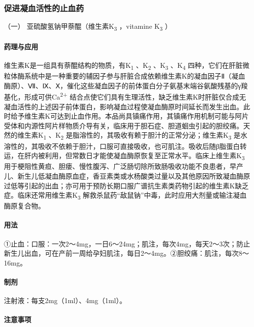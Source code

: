 \subsubsection{促进凝血活性的止血药}

\hypertarget{text00438.htmlux5cux23CHP17-8-1-1}{}
（一） 亚硫酸氢钠甲萘醌（维生素K\textsubscript{3} ，vitamine
K\textsubscript{3} ）

\paragraph{药理与应用}

维生素K是一组具有萘醌结构的物质，有K\textsubscript{1}
、K\textsubscript{2} 、K\textsubscript{3} 、K\textsubscript{4}
四种，它们在肝脏微粒体酶系统中是一种重要的辅因子参与肝脏合成依赖维生素K的凝血因子Ⅱ（凝血酶原）、Ⅶ、Ⅸ、Ⅹ，催化这些凝血因子的前体蛋白分子氨基末端谷氨酸残基的γ羧基化，形成可供Ca\textsuperscript{2+}
结合点使它们具有生理活性，缺乏维生素K时肝脏仅合成无凝血活性的上述因子前体蛋白，影响凝血过程使凝血酶原时间延长而发生出血。此时给予维生素K可达到止血作用。本品尚具镇痛作用，其镇痛作用机制可能与阿片受体和内源性阿片样物质介导有关，临床用于胆石症、胆道蛔虫引起的胆绞痛。天然的维生素K\textsubscript{1}
、K\textsubscript{2}
是脂溶性的，其吸收有赖于胆汁的正常分泌；维生素K\textsubscript{3}
是水溶性的，其吸收不依赖于胆汁，口服可直接吸收，也可肌注。吸收后随β脂蛋白转运，在肝内被利用，但常数日才能使凝血酶原恢复至正常水平。临床上维生素K\textsubscript{3}
用于梗阻性黄疸、胆瘘、慢性腹泻、广泛肠切除所致肠吸收功能不良患者，早产儿、新生儿低凝血酶原血症，香豆素类或水杨酸类过量以及其他原因所致凝血酶原过低等引起的出血；亦可用于预防长期口服广谱抗生素类药物引起的维生素K缺乏症。临床还常用维生素K\textsubscript{3}
解救杀鼠药“敌鼠钠”中毒，此时应用大剂量或输注凝血酶原复合物。

\paragraph{用法}

①止血：口服：一次2～4mg，一日6～24mg；肌注，每次4mg，每天2～3次；防止新生儿出血，可在产前一周给孕妇肌注，每日2～4mg。②胆绞痛：肌注，每次8～16mg。

\paragraph{制剂}

注射液：每支2mg（1ml）、4mg（1ml）。

\paragraph{注意事项}

